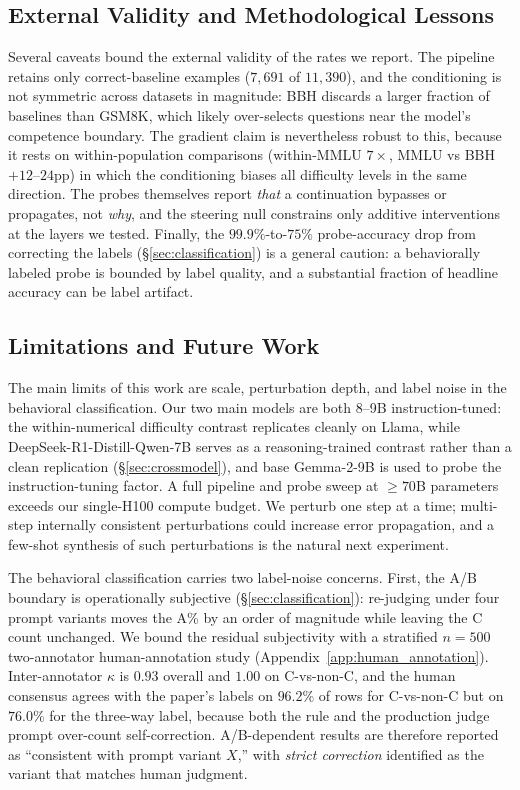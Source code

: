 \documentclass[10pt]{article} %
\begin{document}
\subsection{External Validity and Methodological Lessons}

Several caveats bound the external validity of the rates we report. The pipeline retains only correct-baseline examples ($7{,}691$ of $11{,}390$), and the conditioning is not symmetric across datasets in magnitude: BBH discards a larger fraction of baselines than GSM8K, which likely over-selects questions near the model's competence boundary. The gradient claim is nevertheless robust to this, because it rests on within-population comparisons (within-MMLU $7\times$, MMLU vs BBH $+12$--$24$pp) in which the conditioning biases all difficulty levels in the same direction. The probes themselves report \emph{that} a continuation bypasses or propagates, not \emph{why}, and the steering null constrains only additive interventions at the layers we tested. Finally, the $99.9\%$-to-$75\%$ probe-accuracy drop from correcting the labels (\S\ref{sec:classification}) is a general caution: a behaviorally labeled probe is bounded by label quality, and a substantial fraction of headline accuracy can be label artifact.

\subsection{Limitations and Future Work}

The main limits of this work are scale, perturbation depth, and label noise in the behavioral classification. Our two main models are both 8--9B instruction-tuned: the within-numerical difficulty contrast replicates cleanly on Llama, while DeepSeek-R1-Distill-Qwen-7B serves as a reasoning-trained contrast rather than a clean replication (\S\ref{sec:crossmodel}), and base Gemma-2-9B is used to probe the instruction-tuning factor. A full pipeline and probe sweep at $\geq 70$B parameters exceeds our single-H100 compute budget. We perturb one step at a time; multi-step internally consistent perturbations could increase error propagation, and a few-shot synthesis of such perturbations is the natural next experiment.

The behavioral classification carries two label-noise concerns. First, the A/B boundary is operationally subjective (\S\ref{sec:classification}): re-judging under four prompt variants moves the A\% by an order of magnitude while leaving the C count unchanged. We bound the residual subjectivity with a stratified $n = 500$ two-annotator human-annotation study (Appendix~\ref{app:human_annotation}). Inter-annotator $\kappa$ is $0.93$ overall and $1.00$ on C-vs-non-C, and the human consensus agrees with the paper's labels on $96.2\%$ of rows for C-vs-non-C but on $76.0\%$ for the three-way label, because both the rule and the production judge prompt over-count self-correction. A/B-dependent results are therefore reported as ``consistent with prompt variant $X$,'' with \emph{strict correction} identified as the variant that matches human judgment.
\end{document}
